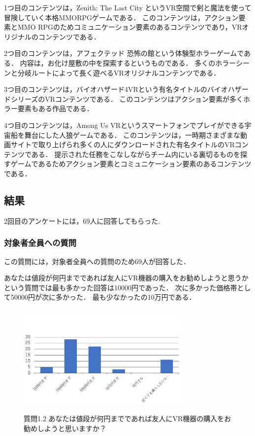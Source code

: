 \documentclass[12pt,a4j]{ltjsarticle}
\begin{document}
1つ目のコンテンツは，Zenith: The Last City というVR空間で剣と魔法を使って冒険していく本格MMORPGゲームである．
このコンテンツは，アクション要素とMMO RPGのためコミュニケーション要素のあるコンテンツであり，VRオリジナルのコンテンツである．

2つ目のコンテンツは，アフェクテッド 恐怖の館という体験型ホラーゲームである．
内容は，お化け屋敷の中を探索するというものである．
多くのホラーシーンと分岐ルートによって長く遊べるVRオリジナルコンテンツである．

3つ目のコンテンツは，バイオハザード4VRという有名タイトルのバイオハザードシリーズのVRコンテンツである．
このコンテンツはアクション要素が多くホラー要素もある作品である．

4つ目のコンテンツは，Among Us VRというスマートフォンでプレイができる宇宙船を舞台にした人狼ゲームである．
このコンテンツは，一時期さまざまな動画サイトで取り上げられ多くの人にダウンロードされた有名タイトルのVRコンテンツである．
提示された任務をこなしながらチーム内にいる裏切るものを探すゲームであるためアクション要素とコミュニケーション要素のあるコンテンツである．

\subsection{結果}
2回目のアンケートには，69人に回答してもらった.

\subsubsection{対象者全員への質問}
この質問には，対象者全員への質問のため69人が回答した．

あなたは値段が何円までであれば友人にVR機器の購入をお勧めしようと思うかという質問では最も多かった回答は10000円であった．
次に多かった価格帯として50000円が次に多かった．
最も少なかったの10万円である．

\begin{figure}[h]
\begin{center}
 \includegraphics[clip,width=85mm,height=55mm]{
 アンケート2_1_2.pdf}
\end{center}
 \caption{質問1.2 あなたは値段が何円までであれば友人にVR機器の購入をお勧めしようと思いますか？}
 \label{fig:アンケート2_1_2.pdf}
\end{figure}
\end{document}

